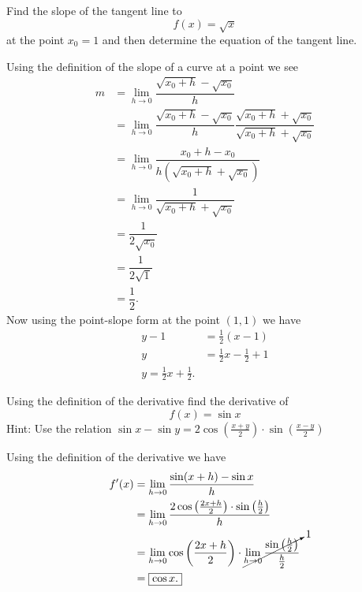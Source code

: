 \documentclass{hwset}
\begin{document}
\begin{problem}[3.] 
	Find the slope of the tangent line to 
	\begin{equation*}
		f(x) = \sqrt{x}
	\end{equation*}
	at the point $x_0 = 1$ and then determine the equation of the tangent line.
\end{problem}

\begin{solution}
	Using the definition of the slope of a curve at a point we see
	\begin{align*}
		m &= \lim_{h\to 0} \dfrac{\sqrt{x_0 + h} - \sqrt{x_0}}{h} \\
		&= \lim_{h\to 0} \dfrac{\sqrt{x_0 + h} - \sqrt{x_0}}{h}
			\dfrac{\sqrt{x_0+h}+\sqrt{x_0}}{\sqrt{x_0+h}+\sqrt{x_0}} \\
		&= \lim_{h\to 0} \dfrac{x_0 + h - x_0}{h
			\left(\sqrt{x_0+h}+\sqrt{x_0}\right)} \\
		&= \lim_{h\to 0} \dfrac{1}{\sqrt{x_0+h}+\sqrt{x_0}} \\
		&= \dfrac{1}{2\sqrt{x_0}} \\
		&= \dfrac{1}{2\sqrt{1}} \\
		&= \boxed{\dfrac{1}{2}.}
	\end{align*}
	Now using the point-slope form at the point $(1,1)$ we have
	\begin{align*}
		y - 1 &= \frac{1}{2}(x - 1) \\
		y &= \frac{1}{2}x - \frac{1}{2} + 1 \\
		\boxed{y = \frac{1}{2}x + \frac{1}{2}.}
	\end{align*}	
\end{solution}

\begin{problem}[4.] 
	Using the definition of the derivative find the derivative of 
	\begin{equation*}
		f(x) = \sin x
	\end{equation*}
	Hint: Use the relation $\sin x - \sin y =	2 \cos\left(\frac{x +
			y}{2}\right)\cdot \sin\left( \frac{x - y}{2}\right)$  
\end{problem}

\begin{solution}
	Using the definition of the derivative we have
	\begin{align*}
		f'(x) &= \lim_{h\to 0} \dfrac{\sin (x + h) - \sin x}{h} \\ 
		&= \lim_{h\to 0} \dfrac{2\cos\left(\frac{2x + h}{2}\right)\cdot \sin
			\left(\frac{h}{2}\right)}{h} \\ 
		&= \lim_{h\to 0} \cos\left(\frac{2x + h}{2}\right) \cdot \cancelto{1}{\lim_{h\to 0}
			\dfrac{\sin \left(\frac{h}{2}\right)}{\frac{h}{2}}} \\ 
		&= \boxed{\cos x.} 
	\end{align*}
\end{solution}
\end{document}
